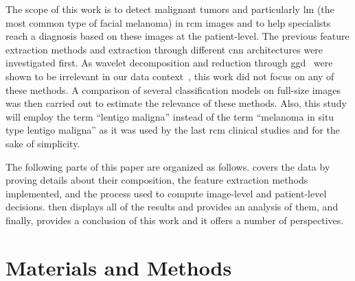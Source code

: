 \documentclass[journal,article,accept,moreauthors,pdftex, applsci]{Definitions/mdpi}
\begin{document}
The scope of this work is to detect malignant tumors and particularly \ac{lm} (the most common type of facial melanoma) in \ac{rcm} images and to help specialists reach a diagnosis based on these images at the patient-level. The previous feature extraction methods and extraction through different \ac{cnn} architectures were investigated first. As wavelet decomposition and reduction through \ac{ggd}~\cite{Halimi2017a} were shown to be irrelevant in our data context~\cite{Cendre2019a}, this work did not focus on any of these methods. A comparison of several classification models on full-size images was then carried out to estimate the relevance of these methods. Also, this study will employ the term “lentigo maligna” instead of the term “melanoma in situ type lentigo maligna” as it was used by the last \ac{rcm} clinical studies \cite{Mataca2018, NAVARRETEDECHENT2019, Robinson2019, Hao2019} and for the sake of simplicity.\par
The following parts of this paper are organized as follows.  covers the data by proving details about their composition, the feature extraction methods implemented, and the process used to compute image-level and patient-level decisions.  then displays all of the results and provides an analysis of them, and finally,  provides a conclusion of this work and it offers a number of perspectives.\par

\section{Materials and Methods}
\label{sec:material}

\end{document}
